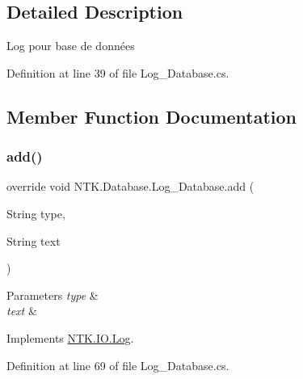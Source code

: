 \subsection{Detailed Description}
Log pour base de données 



Definition at line 39 of file Log\+\_\+\+Database.\+cs.



\subsection{Member Function Documentation}
\mbox{\label{class_n_t_k_1_1_database_1_1_log___database_aad5f90e209def99a3e54c8a04417b26f}} 
\subsubsection{\texorpdfstring{add()}{add()}}
{\footnotesize\ttfamily override void N\+T\+K.\+Database.\+Log\+\_\+\+Database.\+add (\begin{DoxyParamCaption}\item[{String}]{type,  }\item[{String}]{text }\end{DoxyParamCaption})\hspace{0.3cm}{\ttfamily [virtual]}}






\begin{DoxyParams}{Parameters}
{\em type} & \\
\hline
{\em text} & \\
\hline
\end{DoxyParams}


Implements \mbox{\hyperlink{class_n_t_k_1_1_i_o_1_1_log_a5ffd860f0e7cc3631ae108fc5aca4836}{N\+T\+K.\+I\+O.\+Log}}.



Definition at line 69 of file Log\+\_\+\+Database.\+cs.

\mbox{\label{class_n_t_k_1_1_database_1_1_log___database_a4783f62069c0032c8ee979352853c1bb}} 
